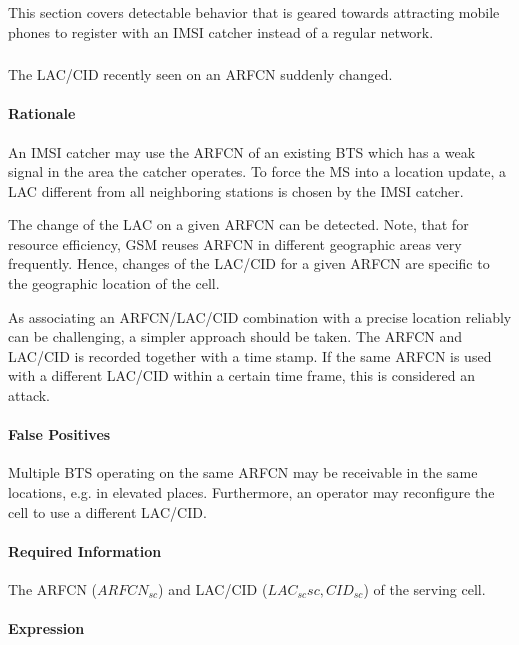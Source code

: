 \documentclass[a4paper,11pt,notitlepage,bigheadings,oneside]{scrartcl}
\begin{document}
This section covers detectable behavior that is geared towards attracting
mobile phones to register with an IMSI catcher instead of a regular network.

\subsubsection{}

The LAC/CID recently seen on an ARFCN suddenly changed.

\paragraph{Rationale}

An IMSI catcher may use the ARFCN of an existing BTS which has a weak signal in
the area the catcher operates. To force the MS into a location update, a LAC
different from all neighboring stations is chosen by the IMSI catcher.

The change of the LAC on a given ARFCN can be detected. Note, that for resource
efficiency, GSM reuses ARFCN in different geographic areas very frequently.
Hence, changes of the LAC/CID for a given ARFCN are specific to the geographic
location of the cell.

As associating an ARFCN/LAC/CID combination with a precise location reliably
can be challenging, a simpler approach should be taken. The ARFCN and LAC/CID
is recorded together with a time stamp. If the same ARFCN is used with a
different LAC/CID within a certain time frame, this is considered an attack.

\paragraph{False Positives}

Multiple BTS operating on the same ARFCN may be receivable in the same
locations, e.g. in elevated places. Furthermore, an operator may reconfigure
the cell to use a different LAC/CID.

\paragraph{Required Information}

The ARFCN ($ARFCN_{sc}$) and LAC/CID ($LAC_{sc}sc,CID_{sc}$) of the serving cell.

\paragraph{Expression}
\end{document}
